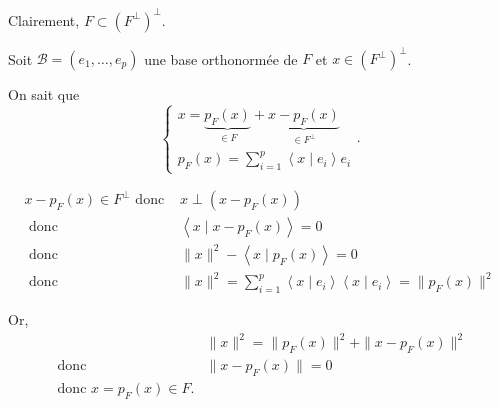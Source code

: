 \begin{prv}
	Clairement, $F \subset \left( F^\perp \right)^\perp$.

	Soit $\mathcal{B} = (e_1, \ldots, e_p)$ une base orthonormée de $F$ et $x \in \left( F^\perp \right)^\perp$.

	On sait que \[
		\begin{cases}
			x = \underbrace{p_F(x)}_{\in F} + \underbrace{x-p_F(x)}_{\in F^\perp}\\
			p_F(x) = \sum_{i=1}^p \left<x \mid e_i \right> e_i
		\end{cases}
	.\]

	\begin{align*}
		x - p_F(x) \in F^\perp \text{ donc }& x \perp (x - p_F(x))\\
		\text{ donc }& \left< x  \mid x - p_F(x) \right> = 0\\
		\text{ donc }& \|x\|^2 - \left<x  \mid p_F(x) \right> = 0\\
		\text{ donc }& \|x\|^2 = \sum_{i=1}^p \left<x \mid e_i \right>\left<x \mid e_i \right> = \|p_F(x)\|^2
	\end{align*}

	Or,
	\begin{align*}
		&\|x\|^2 = \|p_F(x)\|^2 + \|x - p_F(x)\|^2\\
		\text{ donc }& \|x - p_F(x)\| = 0\\
		\text{ donc } x = p_F(x) \in F.
	\end{align*}
\end{prv}

